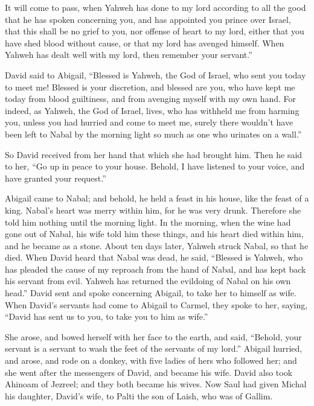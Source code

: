 {It will come to pass, when Yahweh has done to my lord according to all the good that he has spoken concerning you, and has appointed you prince over Israel,
that this shall be no grief to you, nor offense of heart to my lord, either that you have shed blood without cause, or that my lord has avenged himself. When Yahweh has dealt well with my lord, then remember your servant.”
\par }{\PP {}David said to Abigail, “Blessed is Yahweh, the God of Israel, who sent you today to meet me!
Blessed is your discretion, and blessed are you, who have kept me today from blood guiltiness, and from avenging myself with my own hand.
For indeed, as Yahweh, the God of Israel, lives, who has withheld me from harming you, unless you had hurried and come to meet me, surely there wouldn’t have been left to Nabal by the morning light so much as one who urinates on a wall.”
\par }{\PP {}So David received from her hand that which she had brought him. Then he said to her, “Go up in peace to your house. Behold, I have listened to your voice, and have granted your request.”
\par }{\PP {}Abigail came to Nabal; and behold, he held a feast in his house, like the feast of a king. Nabal’s heart was merry within him, for he was very drunk. Therefore she told him nothing until the morning light.
In the morning, when the wine had gone out of Nabal, his wife told him these things, and his heart died within him, and he became as a stone.
About ten days later, Yahweh struck Nabal, so that he died.
When David heard that Nabal was dead, he said, “Blessed is Yahweh, who has pleaded the cause of my reproach from the hand of Nabal, and has kept back his servant from evil. Yahweh has returned the evildoing of Nabal on his own head.” David sent and spoke concerning Abigail, to take her to himself as wife.
When David’s servants had come to Abigail to Carmel, they spoke to her, saying, “David has sent us to you, to take you to him as wife.”
\par }{\PP {}She arose, and bowed herself with her face to the earth, and said, “Behold, your servant is a servant to wash the feet of the servants of my lord.”
Abigail hurried, and arose, and rode on a donkey, with five ladies of hers who followed her; and she went after the messengers of David, and became his wife.
David also took Ahinoam of Jezreel; and they both became his wives.
Now Saul had given Michal his daughter, David’s wife, to Palti the son of Laish, who was of Gallim.

}
